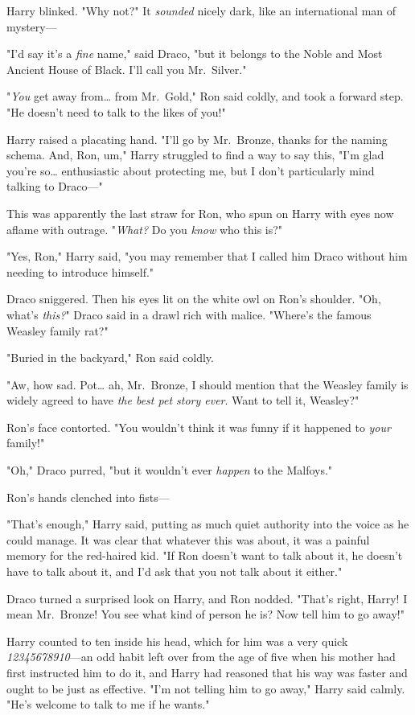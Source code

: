 Harry blinked. "Why not?" It \emph{sounded} nicely dark, like an international 
man of mystery---

"I'd say it's a \emph{fine} name," said Draco, "but it belongs to the Noble and 
Most Ancient House of Black. I'll call you Mr.~Silver."

"\emph{You} get away from{\ldots} from Mr.~Gold," Ron said coldly, and took a 
forward step. "He doesn't need to talk to the likes of you!"

Harry raised a placating hand. "I'll go by Mr.~Bronze, thanks for the naming 
schema. And, Ron, um," Harry struggled to find a way to say this, "I'm glad 
you're so{\ldots} enthusiastic about protecting me, but I don't particularly 
mind talking to Draco---"

This was apparently the last straw for Ron, who spun on Harry with eyes now 
aflame with outrage. "\emph{What?} Do you \emph{know} who this is?"

"Yes, Ron," Harry said, "you may remember that I called him Draco without him 
needing to introduce himself."

Draco sniggered. Then his eyes lit on the white owl on Ron's shoulder. "Oh, 
what's \emph{this?}" Draco said in a drawl rich with malice. "Where's the 
famous Weasley family rat?"

"Buried in the backyard," Ron said coldly.

"Aw, how sad. Pot{\ldots} ah, Mr.~Bronze, I should mention that the Weasley 
family is widely agreed to have \emph{the best pet story ever}. Want to tell 
it, Weasley?"

Ron's face contorted. "You wouldn't think it was funny if it happened to 
\emph{your} family!"

"Oh," Draco purred, "but it wouldn't ever \emph{happen} to the Malfoys."

Ron's hands clenched into fists---

"That's enough," Harry said, putting as much quiet authority into the voice as 
he could manage. It was clear that whatever this was about, it was a painful 
memory for the red-haired kid. "If Ron doesn't want to talk about it, he 
doesn't have to talk about it, and I'd ask that you not talk about it either."

Draco turned a surprised look on Harry, and Ron nodded. "That's right, Harry! I 
mean Mr.~Bronze! You see what kind of person he is? Now tell him to go away!"

Harry counted to ten inside his head, which for him was a very quick 
\emph{12345678910}---an odd habit left over from the age of five when his 
mother had first instructed him to do it, and Harry had reasoned that his way 
was faster and ought to be just as effective. "I'm not telling him to go away," 
Harry said calmly. "He's welcome to talk to me if he wants."

